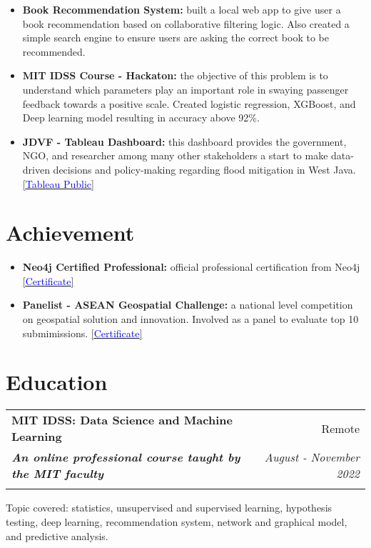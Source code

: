 \documentclass[a4paper, 11pt]{article}
\makeatletter
\newcommand{\resumeItem}[2]{
    \item\small{
        \textbf{#1}{#2 \vspace{-2pt}}
    }
}
\newcommand{\resumeSubheading}[4]{
    \vspace{-1pt}
    \begin{tabular*}{\textwidth}{l@{\extracolsep{\fill}}r}
        \color{lightblue}\textbf{#1} & #2 \\
        \textbf{\textit{\small#3}} & \textit{\small #4} \\
        \textnormal{}\vspace{-5pt}
    \end{tabular*}\vspace{-5pt}
}
\newcommand{\resumeItemListStart}{\begin{itemize}[leftmargin=*]\setlength\itemsep{0em}\vspace{-1pt}}
\newcommand{\resumeItemListEnd}{\end{itemize}\vspace{-5pt}}
\makeatother
\begin{document}
    \resumeItemListStart
    \resumeItem{Book Recommendation System:}{ built a local web app to give user a book
    recommendation based on collaborative filtering logic. Also created a simple search
    engine to ensure users are asking the correct book to be recommended.
    \href{https://github.com/amrirasyidi/book_recommendation}\faGithub}
    \resumeItem{MIT IDSS Course - Hackaton:}{ the objective of this problem is to
    understand which parameters play an important role in swaying passenger feedback
    towards a positive scale. Created logistic regression, XGBoost, and Deep learning
    model resulting in accuracy above 92\%. 
    \href{https://github.com/amrirasyidi/mit_idss_hackaton}\faGithub}
    \resumeItem{JDVF - Tableau Dashboard:}{ this dashboard provides the government, NGO,
    and researcher among many other stakeholders a start to make data-driven decisions
    and policy-making regarding flood mitigation in West Java. 
    \href{https://public.tableau.com/app/profile/faisal.putra/viz/Book1_16671939458310/DashboardFINAL}{[\textcolor{blue}{Tableau Public}]}}
    \resumeItemListEnd

    \vspace{-20pt}
    \section{Achievement}

    \resumeItemListStart
    \resumeItem{Neo4j Certified Professional:}{ official professional certification from 
    Neo4j
    \href{https://graphacademy.neo4j.com/c/4cb304b6-5a5b-4f45-96cf-1840a2982e55/}{[\textcolor{blue}{Certificate}]}}
    \resumeItem{Panelist - ASEAN Geospatial Challenge:}{ a national level competition on 
    geospatial solution and innovation. Involved as a panel to evaluate top 10 submimissions.
    \href{https://drive.google.com/file/d/1NkMhFTBGqnOs2HpcvlLVMFIajq2MSO9k/view?usp=sharing}{[\textcolor{blue}{Certificate}]}}
    \resumeItemListEnd
    
    \vspace{-5pt}
    \section{Education}

    \resumeSubheading
    {MIT IDSS: Data Science and Machine Learning}
    {Remote}
    {An online professional course taught by the MIT faculty}
    {August - November 2022}
    {Topic covered: statistics, unsupervised and supervised learning, hypothesis testing, 
    deep learning, recommendation system, network and graphical model, and predictive 
    analysis.}
    
\end{document}
